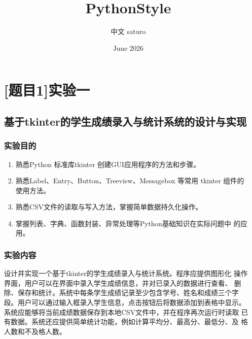 \documentclass{ctexart}
\title{PythonStyle}
\author{中文 saturo}
\date{June 2026}
\begin{document}
\maketitle

\newpage

\tableofcontents

\newpage


\section{[题目1]实验一}
\subsection{基于tkinter的学生成绩录入与统计系统的设计与实现}
\subsubsection{实验目的}
\begin{enumerate}
    \item 熟悉Python 标准库tkinter 创建GUI应用程序的方法和步骤。
    \item 熟悉Label、Entry、Button、Treeview、Messagebox 等常用 tkinter 组件的 使用方法。
    \item 熟悉CSV文件的读取与写入方法，掌握简单数据持久化操作。
    \item 掌握列表、字典、函数封装、异常处理等Python基础知识在实际问题中 的应用。
\end{enumerate}

\subsubsection{实验内容}
设计并实现一个基于tkinter的学生成绩录入与统计系统。程序应提供图形化 操作界面，用户可以在界面中录入学生成绩信息，并对已录入的数据进行查看、 删除、保存和统计。系统中每条学生成绩记录至少包含学号、姓名和成绩三个字 段。用户可以通过输入框录入学生信息，点击按钮后将数据添加到表格中显示。 系统应能够将当前成绩数据保存到本地CSV文件中，并在程序再次运行时读取 已有数据。系统还应提供简单统计功能，例如计算平均分、最高分、最低分、及 格人数和不及格人数。
\end{document}
